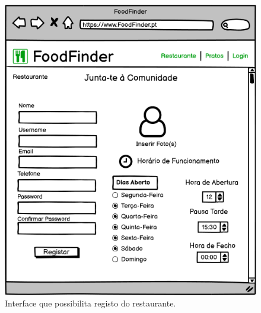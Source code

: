 \documentclass[a4paper,12pt]{report}
\begin{document}
	\begin{figure}[H]
	\begin{center}
	\includegraphics[scale=0.60]{Screen_Registo_Restaurante}	
	\end{center}
	\caption{Interface que possibilita registo do restaurante.}
	\label{fig:Screen_Registo_Restaurante}	
	\end{figure} 
	
\end{document}

